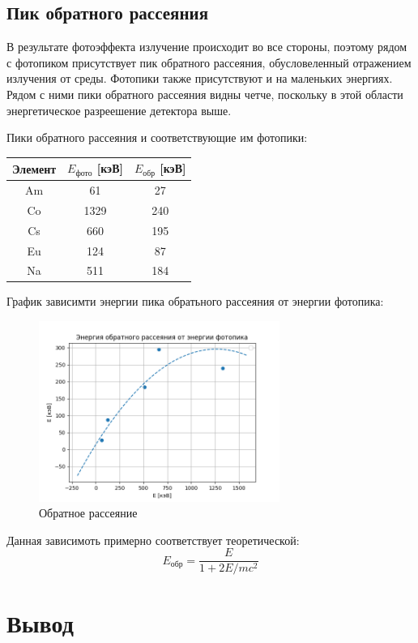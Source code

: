 \documentclass[a4paper,12pt]{article} %
\begin{document}
		\subsection*{Пик обратного рассеяния}
			В результате фотоэффекта излучение происходит во все стороны, поэтому рядом с фотопиком присутствует пик обратного рассеяния, обусловеленный отражением излучения от среды.
			Фотопики также присутствуют и на маленьких энергиях.
			Рядом с ними пики обратного рассеяния видны четче, поскольку в этой области энергетическое разреешение детектора выше.\par
			Пики обратного рассеяния и соответствующие им фотопики:
			\begin{table}[h!]
				\centering
				\begin{tabular}{|c|c|c|}
				\hline
				Элемент & $E_\text{фото}$ [кэВ] & $E_{\text{обр}}$ [кэВ] \\ \hline
				Am      & 61                         & 27                         \\ \hline
				Co      & 1329                       & 240                        \\ \hline
				Cs      & 660                        & 195                        \\ \hline
				Eu      & 124                        & 87                         \\ \hline
				Na      & 511                        & 184                        \\ \hline
				\end{tabular}
			\end{table}\par
			График зависимти энергии пика обратьного рассеяния от энергии фотопика:
			\begin{figure}[h!]
				\includegraphics[width=0.7\textwidth]{img/Back.png}
				\centering
				\caption{Обратное рассеяние}
			\end{figure}\par
			Данная зависимоть примерно соответствует теоретической:
			\begin{equation}
				E_{\text{обр}} = \frac{E}{1 + 2 E / mc^2}
			\end{equation}
	\section{Вывод}
		
\end{document}

